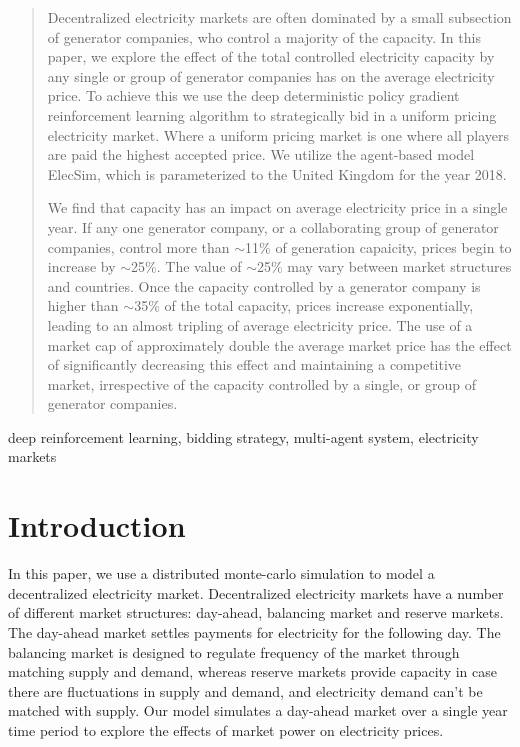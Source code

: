 \documentclass[conference]{IEEEtran}
\begin{document}
\begin{abstract}


Decentralized electricity markets are often dominated by a small subsection of generator companies, who control a majority of the capacity. In this paper, we explore the effect of the total controlled electricity capacity by any single or group of generator companies has on the average electricity price. To achieve this we use the deep deterministic policy gradient reinforcement learning algorithm to strategically bid in a uniform pricing electricity market. Where a uniform pricing market is one where all players are paid the highest accepted price. We utilize the agent-based model ElecSim, which is parameterized to the United Kingdom for the year 2018. 

We find that capacity has an impact on average electricity price in a single year. If any one generator company, or a collaborating group of generator companies, control more than ${\sim}$11\% of generation capaicity, prices begin to increase by ${\sim}$25\%. The value of ${\sim}$25\% may vary between market structures and countries. Once the capacity controlled by a generator company is higher than ${\sim}$35\% of the total capacity, prices increase exponentially, leading to an almost tripling of average electricity price. The use of a market cap of approximately double the average market price has the effect of significantly decreasing this effect and maintaining a competitive market, irrespective of the capacity controlled by a single, or group of generator companies.






\end{abstract}

\begin{IEEEkeywords}
deep reinforcement learning, bidding strategy, multi-agent system, electricity markets
\end{IEEEkeywords}

\section{Introduction}
\label{sec:introduction}

In this paper, we use a distributed monte-carlo simulation to model a decentralized electricity market. Decentralized electricity markets have a number of different market structures: day-ahead, balancing market and reserve markets. The day-ahead market settles payments for electricity for the following day. The balancing market is designed to regulate frequency of the market through matching supply and demand, whereas reserve markets provide capacity in case there are fluctuations in supply and demand, and electricity demand can't be matched with supply. Our model simulates a day-ahead market over a single year time period to explore the effects of market power on electricity prices.
\end{document}
